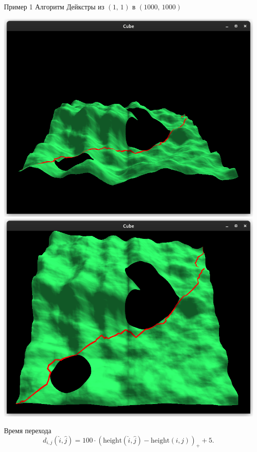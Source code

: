     \begin{frame}[t]{Пример 1}
        Алгоритм Дейкстры из $(1,\,1)$ в $(1000,\,1000)$
        \begin{center}
            \includegraphics[scale=0.18]{content/dijkstra.png}
            \includegraphics[scale=0.18]{content/dijkstra-top.png}
        \end{center}
        Время перехода
        \[
            d_{i,j}(\hat i, \hat j) = 100\cdot(\mathrm{height}(\hat i, \hat j) - \mathrm{height}(i, j))_{+} + 5.
        \]
    \end{frame}
